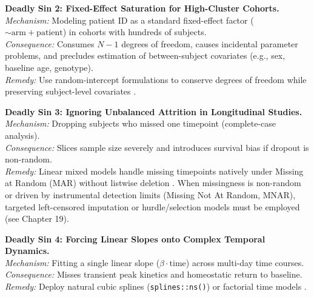 \documentclass[11pt,twoside,openright]{book}
\begin{document}
\begin{pitfallbox}
\textbf{Deadly Sin 2: Fixed-Effect Saturation for High-Cluster Cohorts.}\\
\textit{Mechanism:} Modeling patient ID as a standard fixed-effect factor ($\sim \text{arm} + \text{patient}$) in cohorts with hundreds of subjects.\\
\textit{Consequence:} Consumes $N - 1$ degrees of freedom, causes incidental parameter problems, and precludes estimation of between-subject covariates (e.g., sex, baseline age, genotype).\\
\textit{Remedy:} Use random-intercept formulations to conserve degrees of freedom while preserving subject-level covariates \cite{laird1982random}.
\end{pitfallbox}

\begin{pitfallbox}
\textbf{Deadly Sin 3: Ignoring Unbalanced Attrition in Longitudinal Studies.}\\
\textit{Mechanism:} Dropping subjects who missed one timepoint (complete-case analysis).\\
\textit{Consequence:} Slices sample size severely and introduces survival bias if dropout is non-random.\\
\textit{Remedy:} Linear mixed models handle missing timepoints natively under Missing at Random (MAR) without listwise deletion \cite{fitzmaurice2012applied}. When missingness is non-random or driven by instrumental detection limits (Missing Not At Random, MNAR), targeted left-censored imputation or hurdle/selection models must be employed (see Chapter 19).
\end{pitfallbox}

\begin{pitfallbox}
\textbf{Deadly Sin 4: Forcing Linear Slopes onto Complex Temporal Dynamics.}\\
\textit{Mechanism:} Fitting a single linear slope ($\beta \cdot \text{time}$) across multi-day time courses.\\
\textit{Consequence:} Misses transient peak kinetics and homeostatic return to baseline.\\
\textit{Remedy:} Deploy natural cubic splines (\texttt{splines::ns()}) or factorial time models \cite{wood2017generalized}.
\end{pitfallbox}
\end{document}
